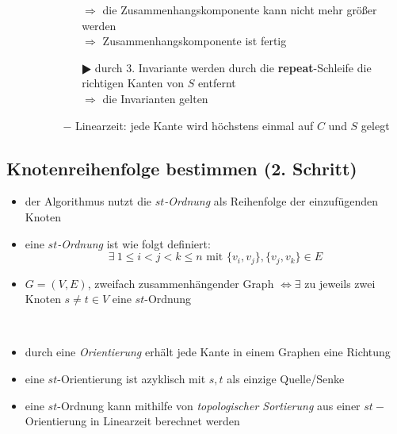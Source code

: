 \begin{itemize}
\begin{itemize}
\begin{enumerate}
\begin{itemize}[itemsep=-1pt]
								$\Rightarrow$ die Zusammenhangskomponente kann nicht mehr größer werden\\
								$\Rightarrow$ Zusammenhangskomponente ist fertig
								\item[$\RHD$] durch 3. Invariante werden durch die \textbf{repeat}-Schleife die richtigen Kanten von $S$ entfernt\\
								$\Rightarrow$ die Invarianten gelten
							\end{itemize}
						\item[$-$] Linearzeit: jede Kante wird höchstens einmal auf $C$ und $S$ gelegt
					\end{enumerate}
			\end{itemize}
\end{itemize}

\subsection{Knotenreihenfolge bestimmen (2. Schritt)}
\begin{minipage}{0.3\textwidth}
	
\end{minipage}
\begin{minipage}{0.6\textwidth}
	\begin{itemize}[itemsep=-1pt]
		\item der Algorithmus nutzt die \textit{$st$-Ordnung} als Reihenfolge der einzufügenden Knoten
		\item eine \textit{$st$-Ordnung} ist wie folgt definiert:
			\[\exists~ 1\leq i<j <k\leq n\text{ mit }\{v_i,v_j\},\{v_j,v_k\}\in E\]
		\item $G=(V,E)$, zweifach zusammenhängender Graph $\Leftrightarrow \exists$ zu jeweils zwei Knoten $s\neq t\in V$ eine $st$-Ordnung
	\end{itemize}
\end{minipage}\\
\begin{itemize}[itemsep=-1pt]
	\item durch eine \textit{Orientierung} erhält jede Kante in einem Graphen eine Richtung
	\item eine $st$-Orientierung ist azyklisch mit $s,t$ als einzige Quelle/Senke
	\item eine $st$-Ordnung kann mithilfe von \textit{topologischer Sortierung} aus einer $st-$Orientierung in Linearzeit berechnet werden
\end{itemize}
\topbreak
\vspace*{-2\baselineskip}

